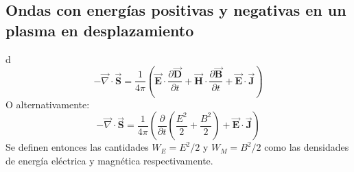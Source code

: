 \documentclass[../tesis_main_file.tex]{subfiles}
\begin{document}
\subsection{Ondas con energías positivas y negativas en un plasma en desplazamiento}
d
\begin{equation}
-\overrightarrow{\nabla} \cdot \overrightarrow{\textbf{S}}= \frac{1}{4 \pi}\left(\overrightarrow{\textbf{E}}\cdot \frac{\partial \overrightarrow{\textbf{D}}}{\partial t} + \overrightarrow{\textbf{H}}\cdot \frac{\partial \overrightarrow{\textbf{B}}}{\partial t} + \overrightarrow{\textbf{E}}\cdot \overrightarrow{\textbf{J}} \right)
\end{equation}
O alternativamente:
\begin{equation}
-\overrightarrow{\nabla} \cdot \overrightarrow{\textbf{S}}= \frac{1}{4 \pi}\left(\frac{\partial}{\partial t}\left(\frac{E^2}{2} + \frac{B^2}{2}\right) + \overrightarrow{\textbf{E}}\cdot \overrightarrow{\textbf{J}} \right)
\end{equation}
Se definen entonces las cantidades $W_E=E^2/2$ y $W_M=B^2/2$ como las densidades de energía eléctrica y magnética respectivamente.
\onlyinsubfile{}
\onlyinsubfile{}
\end{document}
